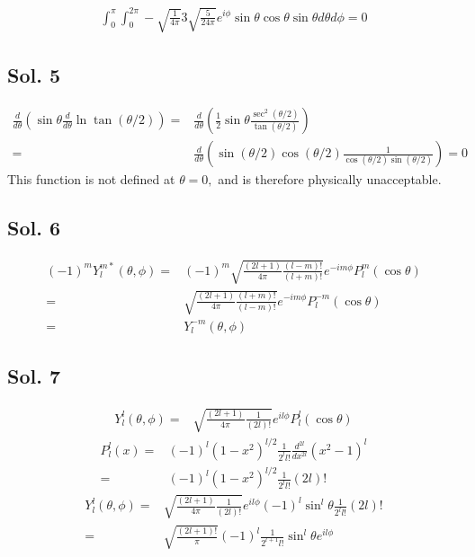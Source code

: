 \begin{align*}
    \int_0^{\pi}
    \int_{0}^{2\pi}
    -\sqrt{\frac{1}{4\pi}}
    3\sqrt{\frac{5}{24\pi}}
e^{i\phi}
\sin\theta\cos\theta
\sin\theta d\theta d\phi=0
\end{align*}


\subsection*{Sol. 5}
\begin{align*}
    \frac{d}{d\theta}
\left(
\sin\theta\frac{d}{d\theta}
\ln\tan(\theta/2)
\right)
=&\frac{d}{d\theta}
\left(\frac{1}{2}\sin\theta \frac{\sec^2(\theta/2)}{\tan(\theta/2)}\right)\\
=&
\frac{d}{d\theta}
(\sin(\theta/2)\cos(\theta/2)\frac{1}{\cos(\theta/2)\sin(\theta/2)}) = 0
\end{align*}
This function is not defined at $\theta=0,$ and is therefore physically unacceptable.

\subsection*{Sol. 6}
\begin{align*}
    (-1)^mY^{m*}_l(\theta,\phi)
    =& 
    (-1)^m
    \sqrt{\frac{(2l+1)}{4\pi}
    \frac{(l-m)!}{(l+m)!}}
    e^{-im\phi}
    P^m_l(\cos\theta)\\
    =&
    \sqrt{\frac{(2l+1)}{4\pi}
    \frac{(l+m)!}{(l-m)!}}
    e^{-im\phi}
    P^{-m}_l(\cos\theta)\\
    =&Y^{-m}_l(\theta,\phi)
\end{align*}

\subsection*{Sol. 7}
\begin{align*}
    Y^l_l(\theta,\phi) =&
    \sqrt{\frac{(2l+1)}{4\pi}\frac{1}{(2l)!}}e^{il\phi}P^l_l(\cos\theta)
\end{align*}
\begin{align*}
    P_l^l(x)=&
    (-1)^l(1-x^2)^{l/2}
    \frac{1}{2^ll!}
    \frac{d^{2l}}{dx^{2l}}
    (x^2-1)^l\\
    =&
    (-1)^l(1-x^2)^{l/2}
    \frac{1}{2^ll!}(2l)!
\end{align*}
\begin{align*}
    Y^l_l(\theta,\phi)=&
    \sqrt{\frac{(2l+1)}{4\pi}\frac{1}{(2l)!}}e^{il\phi}
    (-1)^l\sin^l\theta
    \frac{1}{2^ll!}(2l)!\\
    =&\sqrt{\frac{(2l+1)!}{\pi}}
    (-1)^l\frac{1}{2^{l+1}l!}
\sin^l\theta e^{il\phi}
\end{align*}

